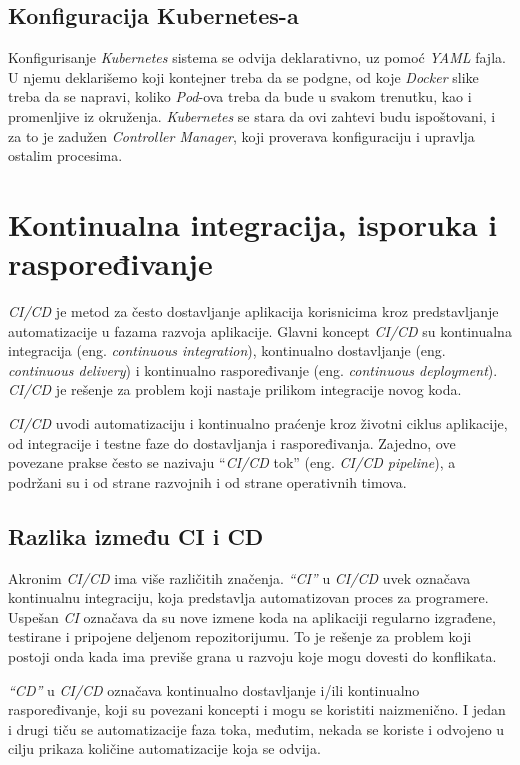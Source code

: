 \subsection{Konfiguracija Kubernetes-a}
Konfigurisanje \textit{Kubernetes} sistema se odvija deklarativno, uz pomoć \textit{YAML} fajla. U njemu deklarišemo
koji kontejner treba da se podgne, od koje \textit{Docker} slike treba da se napravi, koliko \textit{Pod}-ova treba 
da bude u svakom trenutku, kao i promenljive iz okruženja. \textit{Kubernetes} se stara da ovi zahtevi budu 
ispoštovani, i za to je zadužen \textit{Controller Manager}, koji proverava konfiguraciju i upravlja ostalim 
procesima. 

\section{Kontinualna integracija, isporuka i raspoređivanje}\label{sec:arhitektura-ci_cd}

\textit{CI/CD} je metod za često dostavljanje aplikacija korisnicima kroz predstavljanje automatizacije u 
fazama razvoja aplikacije. Glavni koncept \textit{CI/CD} su kontinualna integracija (eng. 
\textit{continuous integration}), kontinualno dostavljanje (eng. \textit{continuous delivery}) i 
kontinualno raspoređivanje (eng. \textit{continuous deployment}). \textit{CI/CD} je rešenje za problem 
koji nastaje prilikom integracije novog koda.

\textit{CI/CD} uvodi automatizaciju i kontinualno praćenje kroz životni ciklus aplikacije, 
od integracije i testne faze do dostavljanja i raspoređivanja. Zajedno, ove povezane prakse 
često se nazivaju “\textit{CI/CD} tok” (eng. \textit{CI/CD pipeline}), a podržani su i od strane razvojnih 
i od strane operativnih timova.

\subsection{Razlika između CI i CD}
Akronim \textit{CI/CD} ima više različitih značenja. \textit{“CI”} u \textit{CI/CD} uvek označava kontinualnu integraciju, 
koja predstavlja automatizovan proces za programere. Uspešan \textit{CI} označava da su nove izmene koda 
na aplikaciji regularno izgrađene, testirane i pripojene deljenom repozitorijumu. To je rešenje 
za problem koji postoji onda kada ima previše grana u razvoju koje mogu dovesti do konflikata.

\textit{“CD”} u \textit{CI/CD} označava kontinualno dostavljanje i/ili kontinualno raspoređivanje, koji su povezani 
koncepti i mogu se koristiti naizmenično. I jedan i drugi tiču se automatizacije faza toka, međutim, 
nekada se koriste i odvojeno u cilju prikaza količine automatizacije koja se odvija.

